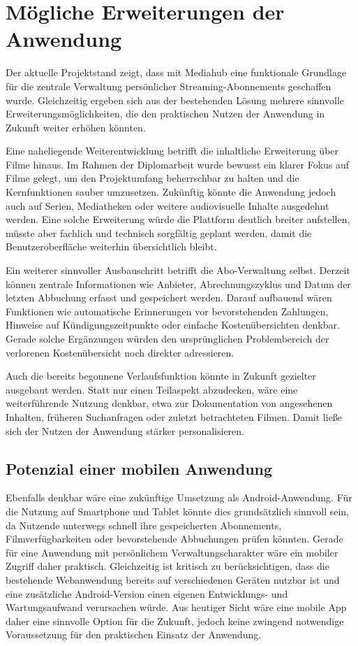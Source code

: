 \section{Mögliche Erweiterungen der Anwendung}
Der aktuelle Projektstand zeigt, dass mit Mediahub eine funktionale Grundlage für die zentrale Verwaltung persönlicher Streaming-Abonnements geschaffen wurde. Gleichzeitig ergeben sich aus der bestehenden Lösung mehrere sinnvolle Erweiterungsmöglichkeiten, die den praktischen Nutzen der Anwendung in Zukunft weiter erhöhen könnten.

Eine naheliegende Weiterentwicklung betrifft die inhaltliche Erweiterung über Filme hinaus. Im Rahmen der Diplomarbeit wurde bewusst ein klarer Fokus auf Filme gelegt, um den Projektumfang beherrschbar zu halten und die Kernfunktionen sauber umzusetzen. Zukünftig könnte die Anwendung jedoch auch auf Serien, Mediatheken oder weitere audiovisuelle Inhalte ausgedehnt werden. Eine solche Erweiterung würde die Plattform deutlich breiter aufstellen, müsste aber fachlich und technisch sorgfältig geplant werden, damit die Benutzeroberfläche weiterhin übersichtlich bleibt.

Ein weiterer sinnvoller Ausbauschritt betrifft die Abo-Verwaltung selbst. Derzeit können zentrale Informationen wie Anbieter, Abrechnungszyklus und Datum der letzten Abbuchung erfasst und gespeichert werden. Darauf aufbauend wären Funktionen wie automatische Erinnerungen vor bevorstehenden Zahlungen, Hinweise auf Kündigungszeitpunkte oder einfache Kostenübersichten denkbar. Gerade solche Ergänzungen würden den ursprünglichen Problembereich der verlorenen Kostenübersicht noch direkter adressieren.

Auch die bereits begonnene Verlaufsfunktion könnte in Zukunft gezielter ausgebaut werden. Statt nur einen Teilaspekt abzudecken, wäre eine weiterführende Nutzung denkbar, etwa zur Dokumentation von angesehenen Inhalten, früheren Suchanfragen oder zuletzt betrachteten Filmen. Damit ließe sich der Nutzen der Anwendung stärker personalisieren.

\subsection{Potenzial einer mobilen Anwendung}
Ebenfalls denkbar wäre eine zukünftige Umsetzung als Android-Anwendung. Für die Nutzung auf Smartphone und Tablet könnte dies grundsätzlich sinnvoll sein, da Nutzende unterwegs schnell ihre gespeicherten Abonnements, Filmverfügbarkeiten oder bevorstehende Abbuchungen prüfen könnten. Gerade für eine Anwendung mit persönlichem Verwaltungscharakter wäre ein mobiler Zugriff daher praktisch. Gleichzeitig ist kritisch zu berücksichtigen, dass die bestehende Webanwendung bereits auf verschiedenen Geräten nutzbar ist und eine zusätzliche Android-Version einen eigenen Entwicklungs- und Wartungsaufwand verursachen würde. Aus heutiger Sicht wäre eine mobile App daher eine sinnvolle Option für die Zukunft, jedoch keine zwingend notwendige Voraussetzung für den praktischen Einsatz der Anwendung.

